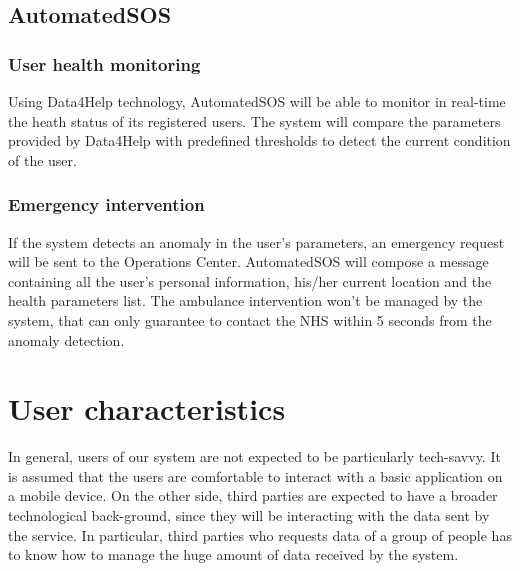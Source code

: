     \subsection{AutomatedSOS}
        \subsubsection{User health monitoring}
            Using Data4Help technology, AutomatedSOS will be able to monitor in real-time the heath status of its registered users. 
            The system will compare the parameters provided by Data4Help with predefined thresholds to detect the current condition of the user.
        
        \subsubsection {Emergency intervention}
            If the system detects an anomaly in the user's parameters, an emergency request will be sent to the Operations Center.
            AutomatedSOS will compose a message containing all the user's personal information, his/her current location and the health parameters list.  
            The ambulance intervention won't be managed by the system, that can only guarantee to contact the NHS within 5 seconds from the anomaly detection.  

\section{User characteristics}
    In general, users of our system are not expected to be particularly tech-savvy. It is assumed that the users are comfortable to interact with a basic application on a mobile device.
    On the other side, third parties are expected to have a broader technological back-ground, since they will be interacting with the data sent by the service.
    In particular, third parties who requests data of a group of people has to know how to manage the huge amount of data received by the system.
    
